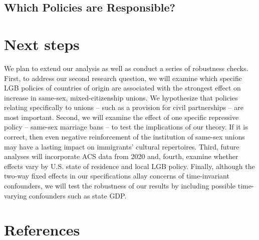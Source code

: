 \documentclass[
  12pt,
]{article}
\begin{document}
\hypertarget{which-policies-are-responsible}{%
\subsection{Which Policies are Responsible?}\label{which-policies-are-responsible}}

\hypertarget{next-steps}{%
\section{Next steps}\label{next-steps}}

We plan to extend our analysis as well as conduct a series of robustness checks. First, to address our second research question, we will examine which specific LGB policies of countries of origin are associated with the strongest effect on increase in same-sex, mixed-citizenship unions. We hypothesize that policies relating specifically to unions -- such as a provision for civil partnerships -- are most important. Second, we will examine the effect of one specific repressive policy -- same-sex marriage bans -- to test the implications of our theory. If it is correct, then even negative reinforcement of the institution of same-sex unions may have a lasting impact on immigrants' cultural repertoires. Third, future analyses will incorporate ACS data from 2020 and, fourth, examine whether effects vary by U.S. state of residence and local LGB policy. Finally, although the two-way fixed effects in our specifications allay concerns of time-invariant confounders, we will test the robustness of our results by including possible time-varying confounders such as state GDP.

\hypertarget{references}{%
\section*{References}\label{references}}
\end{document}
